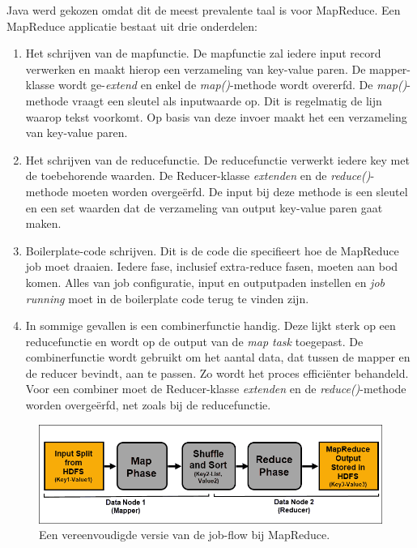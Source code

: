 \documentclass[a4paper,10pt,twoside]{report}
\begin{document}
Java werd gekozen omdat dit de meest prevalente taal is voor MapReduce. Een MapReduce applicatie bestaat uit drie onderdelen:

\begin{enumerate}
	\item Het schrijven van de mapfunctie. De mapfunctie zal iedere input record verwerken en maakt hierop een verzameling van key-value paren. De mapper-klasse wordt ge-\textit{extend} en enkel de \textit{map()}-methode wordt overerfd. De \textit{map()}-methode vraagt een sleutel als inputwaarde op. Dit is regelmatig de lijn waarop tekst voorkomt. Op basis van deze invoer maakt het een verzameling van key-value paren.
	\item Het schrijven van de reducefunctie. De reducefunctie verwerkt iedere key met de toebehorende waarden. De Reducer-klasse \textit{extenden} en de \textit{reduce()}-methode moeten worden overgeërfd. De input bij deze methode is een sleutel en een set waarden dat de verzameling van output key-value paren gaat maken.
	\item Boilerplate-code schrijven. Dit is de code die specifieert hoe de MapReduce job moet draaien. Iedere fase, inclusief extra-reduce fasen, moeten aan bod komen. Alles van job configuratie, input en outputpaden instellen en \textit{job running} moet in de boilerplate code terug te vinden zijn. 
	\item In sommige gevallen is een combinerfunctie handig. Deze lijkt sterk op een reducefunctie en wordt op de output van de \textit{map task} toegepast. De combinerfunctie wordt gebruikt om het aantal data, dat tussen de mapper en de reducer bevindt, aan te passen. Zo wordt het proces efficiënter behandeld. Voor een combiner moet de Reducer-klasse \textit{extenden} en de \textit{reduce()}-methode worden overgeërfd, net zoals bij de reducefunctie.
\end{enumerate}

\begin{figure}
	\includegraphics[width=\linewidth]{images/mapper-reducer-mapreduce-job-flow.png}
	\caption{Een vereenvoudigde versie van de job-flow bij MapReduce.}
\end{figure}
\end{document}
